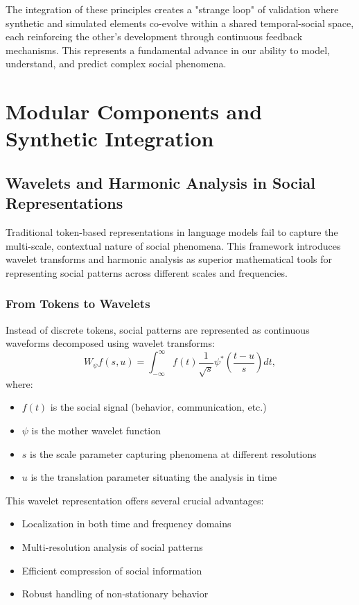 \documentclass[11pt,a4paper]{article}
\begin{document}
The integration of these principles creates a "strange loop" of validation where synthetic and simulated elements co-evolve within a shared temporal-social space, each reinforcing the other's development through continuous feedback mechanisms. This represents a fundamental advance in our ability to model, understand, and predict complex social phenomena.

\section{Modular Components and Synthetic Integration}

\subsection{Wavelets and Harmonic Analysis in Social Representations}

Traditional token-based representations in language models fail to capture the multi-scale, contextual nature of social phenomena. This framework introduces wavelet transforms and harmonic analysis as superior mathematical tools for representing social patterns across different scales and frequencies.

\subsubsection{From Tokens to Wavelets}

Instead of discrete tokens, social patterns are represented as continuous waveforms decomposed using wavelet transforms:
\begin{equation}
W_\psi f(s, u) = \int_{-\infty}^{\infty} f(t) \frac{1}{\sqrt{s}} \psi^*\left(\frac{t - u}{s}\right) dt,
\end{equation}
where:
\begin{itemize}
\item $f(t)$ is the social signal (behavior, communication, etc.)
\item $\psi$ is the mother wavelet function
\item $s$ is the scale parameter capturing phenomena at different resolutions
\item $u$ is the translation parameter situating the analysis in time
\end{itemize}

This wavelet representation offers several crucial advantages:
\begin{itemize}
\item Localization in both time and frequency domains
\item Multi-resolution analysis of social patterns
\item Efficient compression of social information
\item Robust handling of non-stationary behavior
\end{itemize}
\end{document}
